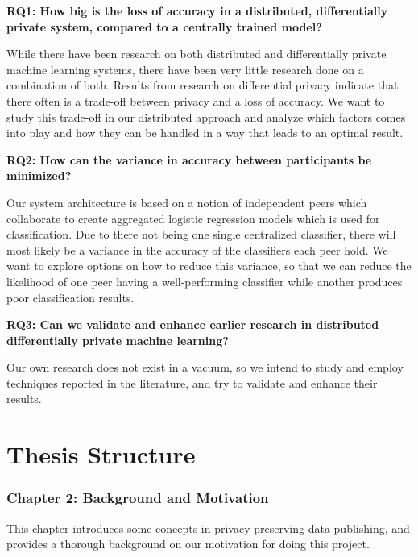 \vspace{3mm}
\noindent\textbf{RQ1: How big is the loss of accuracy in a distributed, differentially private system, compared to a centrally trained model?}

\noindent While there have been research on both distributed and differentially private machine learning systems, there have been very little research done on a combination of both. Results from research on differential privacy indicate that there often is a trade-off between privacy and a loss of accuracy. We want to study this trade-off in our distributed approach and analyze which factors comes into play and how they can be handled in a way that leads to an optimal result. 

\vspace{3mm}
\noindent
\textbf{RQ2: How can the variance in accuracy between participants be minimized?}

\noindent Our system architecture is based on a notion of independent peers which collaborate to create aggregated logistic regression models which is used for classification. Due to there not being one single centralized classifier, there will most likely be a variance in the accuracy of the classifiers each peer hold. We want to explore options on how to reduce this variance, so that we can reduce the likelihood of one peer having a well-performing classifier while another produces poor classification results. 

\vspace{3mm}
\noindent
\textbf{RQ3: Can we validate and enhance earlier research in distributed differentially private machine learning?}

\noindent Our own research does not exist in a vacuum, so we intend to study and employ techniques reported in the literature, and try to validate and enhance their results.   



\section{Thesis Structure}
\subsubsection{Chapter 2: Background and Motivation}
This chapter introduces some concepts in privacy-preserving data publishing, and provides a thorough background on our motivation for doing this project.

